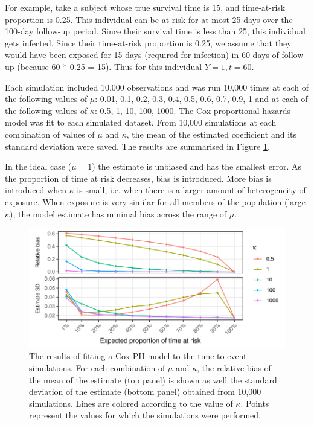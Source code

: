 For example, take a subject whose true survival time is 15, and time-at-risk proportion is 0.25. This individual can be at risk for at most 25 days over the 100-day follow-up period. Since their survival time is less than 25, this individual gets infected. Since their time-at-risk proportion is 0.25, we assume that they would have been exposed for 15 days (required for infection) in 60 days of follow-up (because 60 * 0.25 = 15). Thus for this individual $Y=1, t=60$.

Each simulation included 10,000 observations and was run 10,000 times at each of the following values of $\mu$: 0.01, 0.1, 0.2, 0.3, 0.4, 0.5, 0.6, 0.7, 0.9, 1 and at each of the following values of $\kappa$: 0.5, 1, 10, 100, 1000. The Cox proportional hazards model was fit to each simulated dataset. From 10,000 simulations at each combination of values of $\mu$ and $\kappa$, the mean of the estimated coefficient and its standard deviation were saved. The results are summarised in Figure \ref{CoxSimResults}.

In the ideal case ($\mu = 1$) the estimate is unbiased and has the smallest error. As the proportion of time at risk decreases, bias is introduced. More bias is introduced when $\kappa$ is small, i.e. when there is a larger amount of heterogeneity of exposure. When exposure is very similar for all members of the population (large $\kappa$), the model estimate has minimal bias across the range of $\mu$.

\begin{figure}[htp]
	\centering
	\includegraphics[width=1\textwidth]{../cox-tarprop-plot/risk.pdf}
	\caption{
	The results of fitting a Cox PH model to the time-to-event simulations. For each combination of $\mu$ and $\kappa$, the relative bias of the mean of the estimate (top panel) is shown as well the standard deviation of the estimate (bottom panel) obtained from 10,000 simulations. Lines are colored according to the value of $\kappa$. Points represent the values for which the simulations were performed.
	}
	\label{CoxSimResults}
\end{figure}

